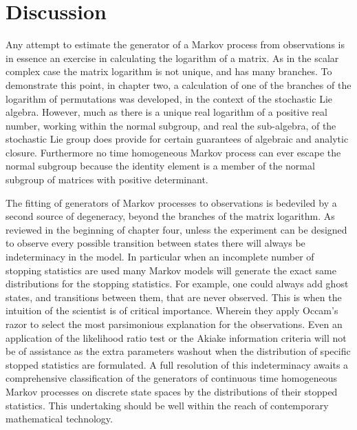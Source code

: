 \section{Discussion}
Any attempt to estimate the generator of a Markov process from observations is in essence an 
exercise in calculating the logarithm of a matrix. As in the scalar complex case the matrix 
logarithm is not unique, and has many branches. To demonstrate this point, in chapter two, 
a calculation of one of the branches of the logarithm of permutations was developed, in the
context of the stochastic Lie algebra. However, much as there is a unique real logarithm of 
a positive real number, working within the normal subgroup, and real the sub-algebra, of the 
stochastic Lie group does provide for certain guarantees of algebraic and analytic closure. 
Furthermore no time homogeneous Markov process can ever escape the normal subgroup because 
the identity element is a member of the normal subgroup of matrices with positive 
determinant.

The fitting of generators of Markov processes to observations is bedeviled by a second
source of degeneracy, beyond the branches of the matrix logarithm. As reviewed in the 
beginning of chapter four, unless the experiment can be designed to observe every possible 
transition between states there will always be indeterminacy in the model. In particular 
when an incomplete number of stopping statistics are used many Markov models will generate 
the exact same distributions for the stopping statistics. For example, one could always add 
ghost states, and transitions between them, that are never observed. This is when the 
intuition of the scientist is of critical importance. Wherein they apply Occam's razor to 
select the most parsimonious explanation for the observations. Even an application of the 
likelihood ratio test or the Akiake information criteria \cite{akaike_new_1974} will not be 
of assistance as the extra parameters washout when the distribution of specific stopped
statistics are formulated. A full resolution of this indeterminacy awaits a comprehensive
classification of the generators of continuous time homogeneous Markov processes on discrete
state spaces by the distributions of their stopped statistics. This undertaking should be
well within the reach of contemporary mathematical technology.

